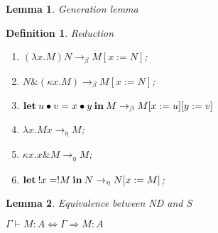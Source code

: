 \documentclass[a4paper]{article}
\newtheorem{lemma}{Lemma}
\newtheorem{defin}{Definition}
\begin{document}
\begin{lemma} Generation lemma
\end{lemma}

\begin{defin} Reduction

  \begin{enumerate}
    \item $(\lambda x. M) N \rightarrow_{\beta} M [x := N]$;
    \item $N \& (\kappa x. M) \rightarrow_{\beta} M [x := N]$;
    \item ${\bf let \:} u \bullet v = x \bullet y {\: \bf in \:} M \rightarrow_{\beta} M [x := u] [y := v]$
    \item $\lambda x. M x \rightarrow_{\eta} M$;
    \item $\kappa x. x \& M \rightarrow_{\eta} M$;
    \item ${\bf let \:} !x = !M {\: \bf in \:} N \rightarrow_{\eta} N [x := M]$;
  \end{enumerate}
\end{defin}

\begin{lemma} Equivalence between ND and S

  $\Gamma \vdash M : A \Leftrightarrow \Gamma \Rightarrow M : A$
\end{lemma}
\end{document}
